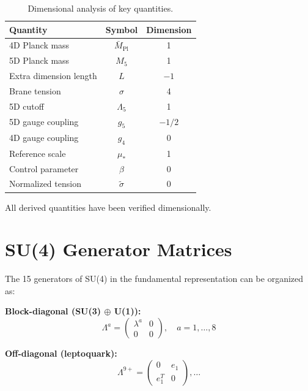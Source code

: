 \documentclass[11pt,a4paper]{article}
\theoremstyle{definition}
\begin{document}
\begin{table}[ht]
\centering
\caption{Dimensional analysis of key quantities.}
\label{tab:dim-summary}
\begin{tabular}{lcc}
\toprule
Quantity & Symbol & Dimension \\
\midrule
4D Planck mass & $\bar{M}_{\text{Pl}}$ & 1 \\
5D Planck mass & $M_5$ & 1 \\
Extra dimension length & $L$ & $-1$ \\
Brane tension & $\sigma$ & 4 \\
5D cutoff & $\Lambda_5$ & 1 \\
5D gauge coupling & $g_5$ & $-1/2$ \\
4D gauge coupling & $g_4$ & 0 \\
Reference scale & $\mu_*$ & 1 \\
Control parameter & $\beta$ & 0 \\
Normalized tension & $\tilde{\sigma}$ & 0 \\
\bottomrule
\end{tabular}
\end{table}

All derived quantities have been verified dimensionally.

\appendix
\section{SU(4) Generator Matrices}
\label{app:generators}

The 15 generators of SU(4) in the fundamental representation can be organized as:

\textbf{Block-diagonal (SU(3) $\oplus$ U(1)):}
\begin{equation}
\label{eq:gen-block}
\Lambda^a = \begin{pmatrix} \lambda^a & 0 \\ 0 & 0 \end{pmatrix}, \quad a = 1, \ldots, 8
\end{equation}

\textbf{Off-diagonal (leptoquark):}
\begin{equation}
\label{eq:gen-lq}
\Lambda^{9+} = \begin{pmatrix} 0 & e_1 \\ e_1^T & 0 \end{pmatrix}, \ldots
\end{equation}
\end{document}
